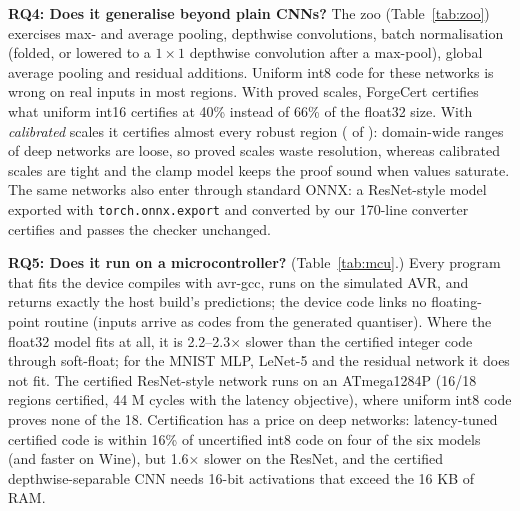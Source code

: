 \begin{table}[t]
\centering\scriptsize
\FCTableZoo
\caption{Architecture zoo at $\varepsilon=1/255$ (50 regions each; M = MNIST, F = Fashion-MNIST). \emph{Acc.}: test accuracy of the float model (\%). \emph{Robust}: regions on which the float model is provably constant. Proved regions for uniform int8, ForgeCert with proved scales (bytes objective) and with calibrated scales; \emph{cex}: int8 regions with a real counterexample. Flash of the ForgeCert code relative to float32.}
\label{tab:zoo}
\end{table}

\textbf{RQ4: Does it generalise beyond plain CNNs?} The zoo (Table~\ref{tab:zoo}) exercises max- and average pooling, depthwise convolutions, batch normalisation (folded, or lowered to a $1\times1$ depthwise convolution after a max-pool), global average pooling and residual additions. Uniform int8 code for these networks is wrong on real inputs in most regions. With proved scales, ForgeCert certifies what uniform int16 certifies at 40\% instead of 66\% of the float32 size. With \emph{calibrated} scales it certifies almost every robust region (\FCZooForgecertCalibratedProved{} of \FCZooRobust): domain-wide ranges of deep networks are loose, so proved scales waste resolution, whereas calibrated scales are tight and the clamp model keeps the proof sound when values saturate. The same networks also enter through standard ONNX: a ResNet-style model exported with \texttt{torch.onnx.export} and converted by our 170-line converter certifies and passes the checker unchanged.

\begin{table}[t]
\centering\scriptsize
\FCTableMCU
\caption{Measured on a cycle-accurate 8-bit AVR (simavr, 16 MHz): ATmega2560 (8 KB RAM), or ATmega1284P (16 KB RAM) for models marked $\dagger$. Flash and RAM of the model; kcycles per inference (mean of 5 inputs). Bit-exact: the device's predictions equal those of the same C file compiled for the host.}
\label{tab:mcu}
\end{table}

\textbf{RQ5: Does it run on a microcontroller?} (Table~\ref{tab:mcu}.) Every program that fits the device compiles with avr-gcc, runs on the simulated AVR, and returns exactly the host build's predictions; the device code links no floating-point routine (inputs arrive as codes from the generated quantiser). Where the float32 model fits at all, it is 2.2--2.3$\times$ slower than the certified integer code through soft-float; for the MNIST MLP, LeNet-5 and the residual network it does not fit. The certified ResNet-style network runs on an ATmega1284P (16/18 regions certified, 44 M cycles with the latency objective), where uniform int8 code proves none of the 18. Certification has a price on deep networks: latency-tuned certified code is within 16\% of uncertified int8 code on four of the six models (and faster on Wine), but 1.6$\times$ slower on the ResNet, and the certified depthwise-separable CNN needs 16-bit activations that exceed the 16 KB of RAM.

